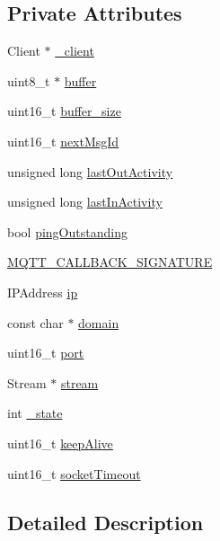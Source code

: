 \subsection*{Private Attributes}
\begin{DoxyCompactItemize}
\item 
Client $\ast$ \hyperlink{class_cool_pub_sub_client_a487a65bafb6e3b8e9ab544b13a8878a0}{\+\_\+client}
\item 
uint8\+\_\+t $\ast$ \hyperlink{class_cool_pub_sub_client_a7e8bcc6096626916046a51bebadc7851}{buffer}
\item 
uint16\+\_\+t \hyperlink{class_cool_pub_sub_client_ae6cb10e42c057483d53516ac830ab526}{buffer\+\_\+size}
\item 
uint16\+\_\+t \hyperlink{class_cool_pub_sub_client_af248fa4e54e878e2fece2891eb98d262}{next\+Msg\+Id}
\item 
unsigned long \hyperlink{class_cool_pub_sub_client_a8930f17c8a384f2e7600b5b854d67506}{last\+Out\+Activity}
\item 
unsigned long \hyperlink{class_cool_pub_sub_client_abfc862f98f6a1a36232e28fd946d8902}{last\+In\+Activity}
\item 
bool \hyperlink{class_cool_pub_sub_client_a1742f1c17f1a1e2332613f925ad30cf9}{ping\+Outstanding}
\item 
\hyperlink{class_cool_pub_sub_client_a021ec75e9fbaf658370b8005ccfddc14}{M\+Q\+T\+T\+\_\+\+C\+A\+L\+L\+B\+A\+C\+K\+\_\+\+S\+I\+G\+N\+A\+T\+U\+RE}
\item 
I\+P\+Address \hyperlink{class_cool_pub_sub_client_adabd958c6c3462433a3f3393f40a0966}{ip}
\item 
const char $\ast$ \hyperlink{class_cool_pub_sub_client_a08d3a5619724f3408ad406ca4fb776e1}{domain}
\item 
uint16\+\_\+t \hyperlink{class_cool_pub_sub_client_a01e3249102c057756af7a515c179844e}{port}
\item 
Stream $\ast$ \hyperlink{class_cool_pub_sub_client_a7a92417b317e7bd9502ed37752111705}{stream}
\item 
int \hyperlink{class_cool_pub_sub_client_aa1953b601206252a30efa5b114eb3e1a}{\+\_\+state}
\item 
uint16\+\_\+t \hyperlink{class_cool_pub_sub_client_a653f086eb3a039c08116bb828e35f7c1}{keep\+Alive}
\item 
uint16\+\_\+t \hyperlink{class_cool_pub_sub_client_a2d7b7c7dda1313ff1492b158c3712630}{socket\+Timeout}
\end{DoxyCompactItemize}


\subsection{Detailed Description}


